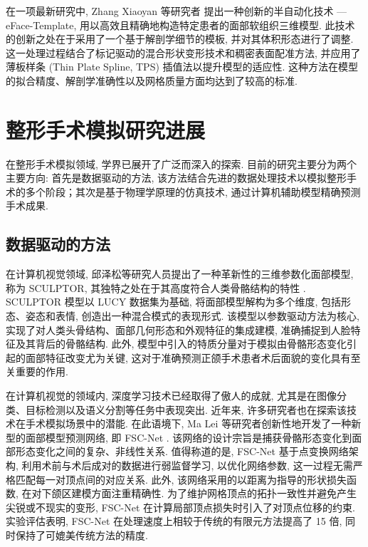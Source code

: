 在一项最新研究中, Zhang Xiaoyan 等研究者 \cite{zhangEFacetemplateMethodEfficiently2016} 提出一种创新的半自动化技术 --- eFace-Template, 用以高效且精确地构造特定患者的面部软组织三维模型.
此技术的创新之处在于采用了一个基于解剖学细节的模板, 并对其体积形态进行了调整.
这一处理过程结合了标记驱动的混合形状变形技术和稠密表面配准方法, 并应用了薄板样条 (Thin Plate Spline, TPS) 插值法以提升模型的适应性.
这种方法在模型的拟合精度、解剖学准确性以及网格质量方面均达到了较高的标准.

\section{整形手术模拟研究进展}

在整形手术模拟领域, 学界已展开了广泛而深入的探索.
目前的研究主要分为两个主要方向: 首先是数据驱动的方法, 该方法结合先进的数据处理技术以模拟整形手术的多个阶段；其次是基于物理学原理的仿真技术, 通过计算机辅助模型精确预测手术成果.

\subsection{数据驱动的方法}

在计算机视觉领域, 邱泽松等研究人员提出了一种革新性的三维参数化面部模型, 称为 SCULPTOR, 其独特之处在于其高度符合人类骨骼结构的特性 \cite{qiuSCULPTORSkeletonconsistentFace2022a}.
SCULPTOR 模型以 LUCY 数据集为基础, 将面部模型解构为多个维度, 包括形态、姿态和表情, 创造出一种混合模式的表现形式.
该模型以参数驱动方法为核心, 实现了对人类头骨结构、面部几何形态和外观特征的集成建模, 准确捕捉到人脸特征及其背后的骨骼结构.
此外, 模型中引入的特质分量对于模拟由骨骼形态变化引起的面部特征改变尤为关键, 这对于准确预测正颌手术患者术后面貌的变化具有至关重要的作用.

在计算机视觉的领域内, 深度学习技术已经取得了傲人的成就, 尤其是在图像分类、目标检测以及语义分割等任务中表现突出.
近年来, 许多研究者也在探索该技术在手术模拟场景中的潜能.
在此语境下, Ma Lei 等研究者创新性地开发了一种新型的面部模型预测网络, 即 FSC-Net \cite{maSimulationPostoperativeFacial2023}.
该网络的设计宗旨是捕获骨骼形态变化到面部形态变化之间的复杂、非线性关系.
值得称道的是, FSC-Net 基于点变换网络架构, 利用术前与术后成对的数据进行弱监督学习, 以优化网络参数, 这一过程无需严格匹配每一对顶点间的对应关系.
此外, 该网络采用的以距离为指导的形状损失函数, 在对下颌区建模方面注重精确性.
为了维护网格顶点的拓扑一致性并避免产生尖锐或不现实的变形, FSC-Net 在计算局部顶点损失时引入了对顶点位移的约束.
实验评估表明, FSC-Net 在处理速度上相较于传统的有限元方法提高了 15 倍, 同时保持了可媲美传统方法的精度.

